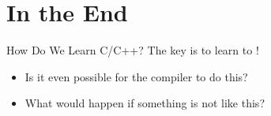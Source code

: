 \documentclass[handout]{beamer}
\begin{document}
\section{In the End}

\begin{frame}{How Do We Learn C/C++?}
    The key is to learn to !
    \pause
    \begin{itemize}
        \item Is it even possible for the compiler to do this?
        \pause
        \item What would happen if something is not like this?
    \end{itemize}
\end{frame}
\end{document}
